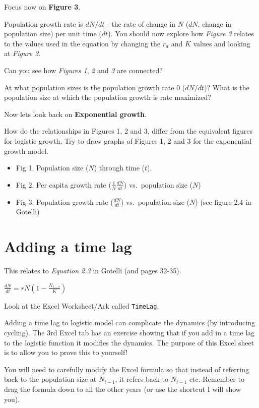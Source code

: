 \documentclass[
  a4paper]{book}
\providecommand{\tightlist}{%
  \setlength{\itemsep}{0pt}\setlength{\parskip}{0pt}}
\begin{document}
Focus now on \textbf{Figure 3}.

Population growth rate is \(dN/dt\) - the rate of change in \(N\)
(\(dN\), change in population size) per unit time (\(dt\)). You should
now explore how \emph{Figure 3} relates to the values used in the
equation by changing the \(r_d\) and \(K\) values and looking at
\emph{Figure 3}.

Can you see how \emph{Figures 1}, \emph{2} and \emph{3} are connected?

At what population sizes is the population growth rate 0 (\(dN/dt\))?
What is the population size at which the population growth is rate
maximized?

Now lets look back on \textbf{Exponential growth}.

How do the relationships in Figures 1, 2 and 3, differ from the
equivalent figures for logistic growth. Try to draw graphs of Figures 1,
2 and 3 for the exponential growth model.

\begin{itemize}
\tightlist
\item
  Fig 1. Population size (\(N\)) through time (\(t\)).
\item
  Fig 2. Per capita growth rate (\(\frac{1}{N} \frac{dN}{dt}\))
  vs.~population size (\(N\))
\item
  Fig 3. Population growth rate (\(\frac{dN}{dt}\)) vs.~population size
  (\(N\)) (see figure 2.4 in Gotelli)
\end{itemize}

\hypertarget{adding-a-time-lag}{%
\section{Adding a time lag}\label{adding-a-time-lag}}

This relates to \emph{Equation 2.3} in Gotelli (and pages 32-35).

\(\frac{d N}{d t}=r N\left(1-\frac{N_{t-\tau}}{K}\right)\)

Look at the Excel Worksheet/Ark called \texttt{TimeLag}.

Adding a time lag to logistic model can complicate the dynamics (by
introducing cycling). The 3rd Excel tab has an exercise showing that if
you add in a time lag to the logistic function it modifies the dynamics.
The purpose of this Excel sheet is to allow you to prove this to
yourself!

You will need to carefully modify the Excel formula so that instead of
referring back to the population size at \(N_{t-1}\), it refers back to
\(N_{t-1}\) etc. Remember to drag the formula down to all the other
years (or use the shortcut I will show you).
\end{document}
